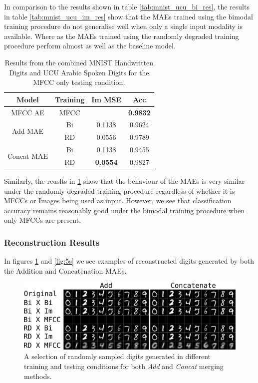 In comparison to the results shown in table \ref{tab:mnist_ucu_bi_res}, the results in table \ref{tab:mnist_ucu_im_res} show that the MAEs trained using the bimodal training procedure do not generalise well when only a single input modality is available. Where as the MAEs trained using the randomly degraded training procedure perform almost as well as the baseline model. 
\begin{table}
	\centering
		\begin{tabular}{|c|c|c|c|}
		\hline
		Model & Training & Im MSE &  Acc \\ \hline
				
				MFCC AE & MFCC & 					& 	\textbf{0.9832}	\\ \hline		
\multirow{2}{*}{Add MAE} & Bi & 	0.1138			& 	0.9624 			\\ \cline{2-4}
						  & RD &	0.0556			&	0.9789			\\ \hline	
		
\multirow{2}{*}{Concat MAE} & Bi &	0.1138			&	0.9455			\\ \cline{2-4}		
							 & RD & \textbf{0.0554}	& 	0.9827 			\\ \hline
		\end{tabular}
		\caption{Results from the combined MNIST Handwritten Digits and UCU Arabic Spoken Digits for the MFCC only testing condition.}
		\label{tab:mnist_ucu_mfcc_res}

\end{table}

Similarly, the reuslts in \ref{tab:mnist_ucu_mfcc_res} show that the behaviour of the MAEs is very similar under the randomly degraded training procedure regardless of whether it is MFCCs or Images being used as input. However, we see that classification accuracy remains reasonably good under the bimodal training procedure when only MFCCs are present. 

\subsubsection{Reconstruction Results}

In figures \ref{fig:mnistDigits} and \ref{fig:5s} we see examples of reconstructed digits generated by both the Addition and Concatenation MAEs.
\begin{figure}[h]
\begin{center}
	\includegraphics[width=\textwidth]{Figs/mnistSpoken/lbAll.png}
	\caption{A selection of randomly sampled digits generated in different training and testing conditions for both \textit{Add} and \textit{Concat} merging methods.}
	\label{fig:mnistDigits}
\end{center}
\end{figure}

